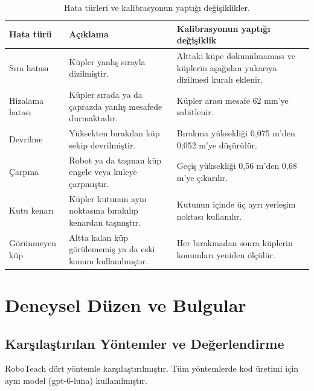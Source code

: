 \documentclass[preprint,12pt]{elsarticle}
\begin{document}
\begin{table}[htbp]
\centering
\caption{Hata türleri ve kalibrasyonun yaptığı değişiklikler.}
\label{tab:2}
\begin{tabularx}{\textwidth}{@{}l Y Y@{}}
\toprule
Hata türü & Açıklama & Kalibrasyonun yaptığı değişiklik \\
\midrule
Sıra hatası & Küpler yanlış sırayla dizilmiştir. & Alttaki küpe dokunulmaması ve küplerin aşağıdan yukarıya dizilmesi kuralı eklenir. \\
Hizalama hatası & Küpler sırada ya da çaprazda yanlış mesafede durmaktadır. & Küpler arası mesafe 62 mm'ye sabitlenir. \\
Devrilme & Yüksekten bırakılan küp sekip devrilmiştir. & Bırakma yüksekliği 0,075 m'den 0,052 m'ye düşürülür. \\
Çarpma & Robot ya da taşınan küp engele veya kuleye çarpmıştır. & Geçiş yüksekliği 0,56 m'den 0,68 m'ye çıkarılır. \\
Kutu kenarı & Küpler kutunun aynı noktasına bırakılıp kenardan taşmıştır. & Kutunun içinde üç ayrı yerleşim noktası kullanılır. \\
Görünmeyen küp & Altta kalan küp görülememiş ya da eski konum kullanılmıştır. & Her bırakmadan sonra küplerin konumları yeniden ölçülür. \\
\bottomrule
\end{tabularx}
\end{table}

\hypertarget{deneysel-duxfczen-ve-bulgular}{%
\section{Deneysel Düzen ve Bulgular}\label{deneysel-duxfczen-ve-bulgular}}

\hypertarget{karux15fux131laux15ftux131rux131lan-yuxf6ntemler-ve-deux11ferlendirme}{%
\subsection{Karşılaştırılan Yöntemler ve Değerlendirme}\label{karux15fux131laux15ftux131rux131lan-yuxf6ntemler-ve-deux11ferlendirme}}

RoboTeach dört yöntemle karşılaştırılmıştır. Tüm yöntemlerde kod üretimi için aynı model (gpt-6-luna) kullanılmıştır.
\end{document}
